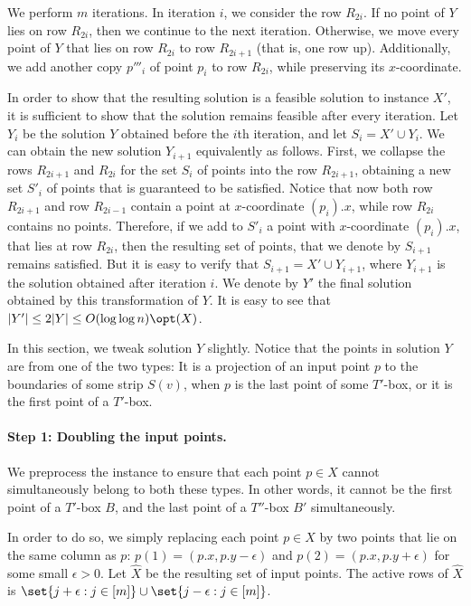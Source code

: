 We perform $m$ iterations. In iteration $i$, we consider the row $R_{2i}$. If no point of $Y$ lies on row $R_{2i}$, then we continue to the next iteration. Otherwise, we move every point of $Y$ that lies on row $R_{2i}$ to row $R_{2i+1}$ (that is, one row up). Additionally, we add another copy $p'''_i$ of point $p_i$ to row $R_{2i}$, while preserving its $x$-coordinate.

In order to show that the resulting solution is a feasible solution to instance $X'$, it is sufficient to show that the solution remains feasible after every iteration. Let $Y_i$ be the solution $Y$ obtained before the $i$th iteration, and let $S_i=X'\cup Y_i$. We can obtain the new solution $Y_{i+1}$ equivalently as follows. First, we collapse the rows $R_{2i+1}$ and $R_{2i}$ for the set $S_i$ of points into the row $R_{2i+1}$, obtaining a new set $S'_i$ of points that is guaranteed to be satisfied. Notice that now both row $R_{2i+1}$ and row $R_{2i-1}$ contain a point at $x$-coordinate $(p_i).x$, while row $R_{2i}$ contains no points. Therefore, if we add to $S'_i$ a point with $x$-coordinate $(p_i).x$, that lies at row $R_{2i}$, then the resulting set of points, that we denote by $S_{i+1}$ remains satisfied. But it is easy to verify that $S_{i+1}=X'\cup Y_{i+1}$, where $Y_{i+1}$ is the solution obtained after iteration $i$.
We denote by $Y'$ the final solution obtained by this transformation of $Y$. It is easy to see that $|Y'|\leq 2|Y|\leq O(\log\log n)\opt(X)$.



\iffalse
In this section, we tweak solution $Y$ slightly. 
Notice that the points in solution $Y$ are from one of the two types: It is a projection of an input point $p$ to the boundaries of some strip $S(v)$, when $p$ is the last point of some $T'$-box, or it is the first point of a $T'$-box. 


\paragraph*{Step 1: Doubling the input points.} We preprocess the instance to ensure that each point $p \in X$ cannot simultaneously belong to both these types. In other words, it cannot be the first point of a $T'$-box $B$, and the last point of a $T''$-box $B'$ simultaneously.

In order to do so, we simply replacing each point $p\in X$ by two points that lie on the same column as $p$: $p(1) = (p.x, p.y-\epsilon)$ and $p(2) = (p.x, p.y+\epsilon)$ for some small $\epsilon >0$.  Let $\hat{X}$ be the resulting set of input points. The active rows of $\hat{X}$ is $\set{j + \epsilon: j \in [m]}\cup \set{j-\epsilon: j \in [m]}$.  

